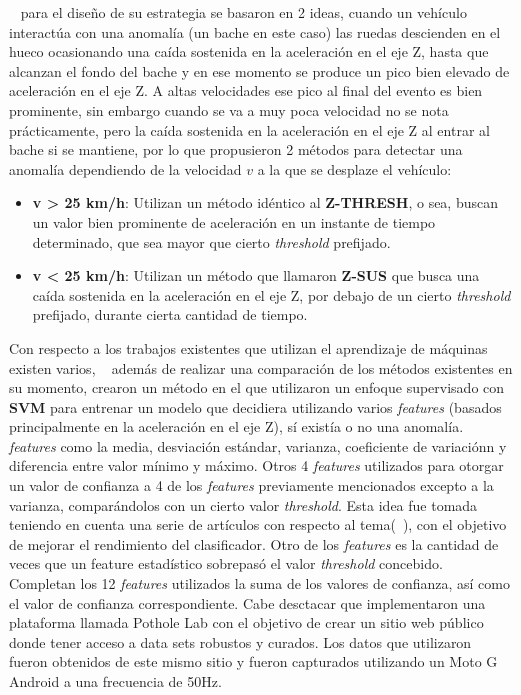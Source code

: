 ~\cite{mohan2008nericell} para el diseño de su estrategia se basaron en 2 ideas, cuando un vehículo interactúa con una
anomalía (un bache en este caso) las ruedas descienden en el hueco ocasionando una caída sostenida en la aceleración en el eje Z,
hasta que alcanzan el fondo del bache y en ese momento se produce un pico bien elevado de aceleración en el eje Z. A altas velocidades
ese pico al final del evento es bien prominente, sin embargo cuando se va a muy poca velocidad no se nota prácticamente, pero la caída
sostenida en la aceleración en el eje Z al entrar al bache si se mantiene, por lo que propusieron 2 métodos para detectar una anomalía
dependiendo de la velocidad $v$ a la que se desplaze el vehículo:\\

\begin{itemize}
	\item \textbf {v > 25 km/h}:  Utilizan un método idéntico al \textbf {Z-THRESH}, o sea, buscan un valor bien prominente de
	      aceleración en un instante de tiempo determinado, que sea mayor que cierto \emph{threshold} prefijado.\\
	\item \textbf {v < 25 km/h}:  Utilizan un método que llamaron \textbf {Z-SUS} que busca una caída sostenida en la aceleración
	      en el eje Z, por debajo de un cierto \emph{threshold} prefijado, durante cierta cantidad de tiempo.\\
\end{itemize}

Con respecto a los trabajos existentes que utilizan el aprendizaje de máquinas existen varios, ~\cite{carlos2018evaluation} además de realizar
una comparación de los métodos existentes en su momento, crearon un método en el que utilizaron un enfoque supervisado con \textbf{SVM} para entrenar
un modelo que decidiera utilizando varios \emph{features} (basados principalmente en la aceleración en el eje Z), sí existía o no una anomalía. \emph{features}
como la media, desviación estándar, varianza, coeficiente de variaciónn y diferencia entre valor mínimo y máximo. Otros 4 \emph{features} utilizados para
otorgar un valor de confianza a 4 de los \emph{features} previamente mencionados excepto a la varianza, comparándolos con un cierto valor \emph{threshold}.
Esta idea fue tomada teniendo en cuenta una serie de artículos con respecto al tema(~\cite{mednis2011real}), con el objetivo de mejorar el rendimiento
del clasificador. Otro de los \emph{features} es la cantidad de veces que un feature estadístico sobrepasó el valor \emph{threshold} concebido. Completan los
12 \emph{features} utilizados la suma de los valores de confianza, así como el valor de confianza correspondiente. Cabe desctacar que implementaron una
plataforma llamada Pothole Lab con el objetivo de crear un sitio web público donde tener acceso a data sets robustos y curados. Los datos que utilizaron fueron
obtenidos de este mismo sitio y fueron capturados utilizando un Moto G Android a una frecuencia de 50Hz.\\

